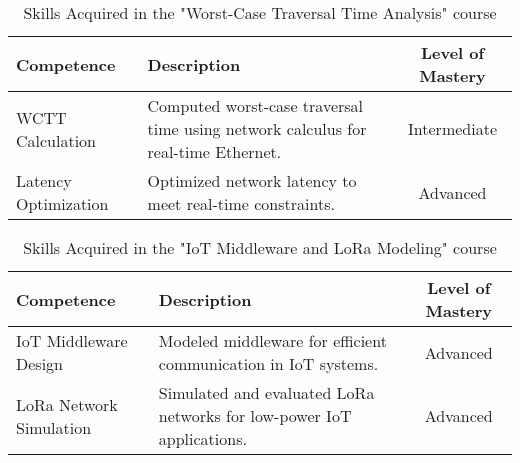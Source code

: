 \begin{table}[H]
    \centering
    \renewcommand{\arraystretch}{1.5} %
    \begin{tabular}{|p{3.5cm}|p{8cm}|c|}
    \hline
    \rowcolor[gray]{0.8}
    \textbf{Competence} & \textbf{Description} & \textbf{Level of Mastery} \\
    \hline
        WCTT Calculation & Computed worst-case traversal time using network calculus for real-time Ethernet. & Intermediate \\ \hline
        Latency Optimization & Optimized network latency to meet real-time constraints. & Advanced \\ \hline
        \end{tabular}
        \caption{Skills Acquired in the "Worst-Case Traversal Time Analysis" course}
        \end{table}
        
\begin{table}[H]
    \centering
    \renewcommand{\arraystretch}{1.5} %
    \begin{tabular}{|p{3.5cm}|p{8cm}|c|}
        \hline
        \rowcolor[gray]{0.8}
        \textbf{Competence} & \textbf{Description} & \textbf{Level of Mastery} \\
        \hline
        IoT Middleware Design & Modeled middleware for efficient communication in IoT systems. & Advanced \\ \hline
        LoRa Network Simulation & Simulated and evaluated LoRa networks for low-power IoT applications. & Advanced \\ \hline
    \end{tabular}
    \caption{Skills Acquired in the "IoT Middleware and LoRa Modeling" course}
\end{table}


